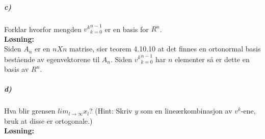 \documentclass[11pt, A4paper,norsk]{article}
\begin{document}
			\subparagraph{c)}
				\begin{flushleft}
Forklar hvorfor mengden ${v^k}^{n-1}_{k=0}$ er en basis for $R^n$. \\
\vspace{1mm}
\textbf{Løsning:} \\
\vspace{1mm}
Siden $A_n$ er en $n X n$ matrise, sier teorem 4.10.10 at det finnes en ortonormal basis bestående av egenvektorene til $A_n$. Siden ${v^k}_{k=0}^{n-1}$ har $n$ elementer så er dette en basis av $R^n$.
				\end{flushleft}












			\subparagraph{d)}
				\begin{flushleft}
Hva blir grensen $lim_{l \rightarrow \infty} x_l$? (Hint: Skriv $y$ som en lineærkombinasjon av $v^k$-ene, bruk at disse er ortogonale.) \\
\vspace{1mm}
\textbf{Løsning:} \\
\vspace{1mm}

				\end{flushleft}
\end{document}
